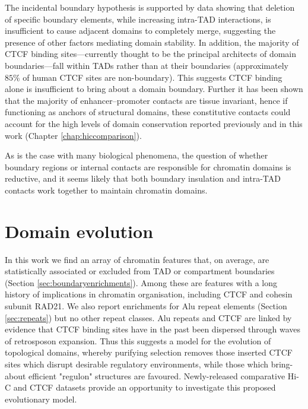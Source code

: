 \documentclass[a4paper,11pt,oneside]{book}
\begin{document}
The incidental boundary hypothesis is supported by data showing that deletion of specific boundary elements, while increasing intra-TAD interactions, is insufficient to cause adjacent domains to completely merge,\cite{Nora2012} suggesting the presence of other factors mediating domain stability. In addition, the majority of CTCF binding sites---currently thought to be the principal architects of domain boundaries---fall within TADs rather than at their boundaries (approximately $85\%$ of human CTCF sites are non-boundary\cite{Dixon2012}). This suggests CTCF binding alone is insufficient to bring about a domain boundary. Further it has been shown that the majority of enhancer--promoter contacts are tissue invariant,\cite{Bouwman2015a} hence if functioning as anchors of structural domains, these constitutive contacts could account for the high levels of domain conservation reported previously\cite{Lieberman2009, Dixon2012, Chambers2013, Rao2014} and in this work (Chapter \ref{chap:hiccomparison}).

As is the case with many biological phenomena, the question of whether boundary regions or internal contacts are responsible for chromatin domains is reductive, and it seems likely that both boundary insulation and intra-TAD contacts work together to maintain chromatin domains.

\section{Domain evolution}

In this work we find an array of chromatin features that, on average, are statistically associated or excluded from TAD or compartment boundaries (Section \ref{sec:boundaryenrichments}). Among these are features with a long history of implications in chromatin organisation, including CTCF and cohesin subunit RAD21. We also report enrichments for Alu repeat elements (Section \ref{sec:repeats}) but no other repeat classes. Alu repeats and CTCF are linked by evidence that CTCF binding sites have in the past been dispersed through waves of retrosposon expansion.\cite{Schmidt2012, Nikolaev2009} Thus this suggests a model for the evolution of topological domains, whereby purifying selection removes those inserted CTCF sites which disrupt desirable regulatory environments, while those which bring-about efficient "regulon" structures are favoured. Newly-released comparative Hi-C and CTCF datasets\cite{VietriRudan2015} provide an opportunity to investigate this proposed evolutionary model. 
\end{document}
